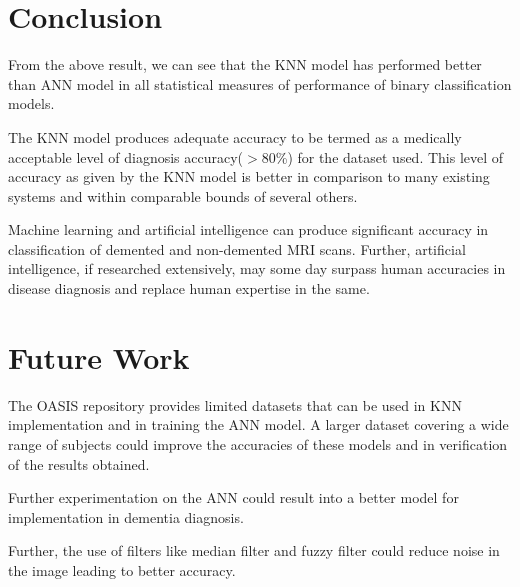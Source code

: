 \documentclass[journal,twoside]{IEEEtran}
\begin{document}
\section{Conclusion}
From the above result, we can see that the KNN model has performed better than ANN model in all statistical measures of performance of binary classification models.
\par The KNN model produces adequate accuracy to be termed as a medically acceptable level of diagnosis accuracy($>$80\%) for the dataset used. This level of accuracy as given by the KNN model is better in comparison to many existing systems and within comparable bounds of several others.
\par Machine learning and artificial intelligence can produce significant accuracy in classification of demented and non-demented MRI scans. Further, artificial intelligence, if researched extensively, may some day surpass human accuracies in disease diagnosis and replace human expertise in the same.

\section{Future Work}
The OASIS repository provides limited datasets that can be used in KNN implementation and in training the ANN model. A larger dataset covering a wide range of subjects could improve the accuracies of these models and in verification of the results obtained. 
\par Further experimentation on the ANN could result into a better model for implementation in dementia diagnosis.
\par Further, the use of filters like median filter and fuzzy filter could reduce noise in the image leading to better accuracy.

%
%
\end{document}
